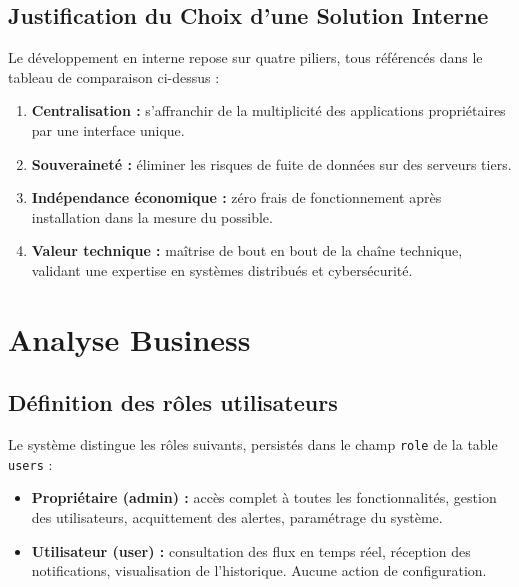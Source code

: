 \documentclass[12pt,a4paper]{article}
\begin{document}
\subsection{Justification du Choix d'une Solution Interne}

Le développement en interne repose sur quatre piliers, tous référencés dans le tableau de comparaison ci-dessus :
\begin{enumerate}
    \item \textbf{Centralisation :} s'affranchir de la multiplicité des applications propriétaires par une interface unique.
    \item \textbf{Souveraineté :} éliminer les risques de fuite de données sur des serveurs tiers.
    \item \textbf{Indépendance économique :} zéro frais de fonctionnement après installation dans la mesure du possible.
    \item \textbf{Valeur technique :} maîtrise de bout en bout de la chaîne technique, validant une expertise en systèmes distribués et cybersécurité.
\end{enumerate}

\section{Analyse Business}

\subsection{Définition des rôles utilisateurs}

Le système distingue les rôles suivants, persistés dans le champ \texttt{role} de la table \texttt{users} :

\begin{itemize}[label=\textbullet]
    \item \textbf{Propriétaire (admin) :} accès complet à toutes les fonctionnalités, gestion des utilisateurs, acquittement des alertes, paramétrage du système.
    \item \textbf{Utilisateur (user) :} consultation des flux en temps réel, réception des notifications, visualisation de l'historique. Aucune action de configuration.
\end{itemize}
\end{document}
